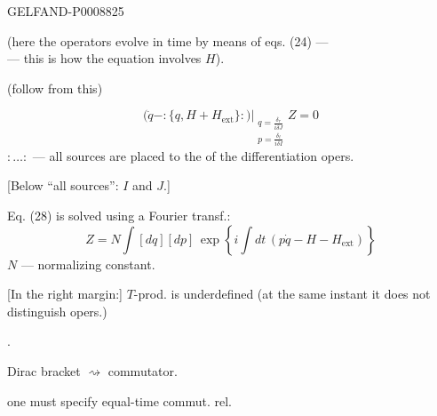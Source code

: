 \begin{GelfandAdjacentEvidence}{GELFAND-P000882}{5}


(here the operators evolve in time by means of eqs. (24) ---\\
--- this is how the equation involves $H$).

 (follow from this)

\end{GelfandAdjacentEvidence}

\begin{equation*}
\left.\bigl(\dot q-:\{q,H+H_{\mathrm{ext}}\}:\bigr)\right|_{\substack{
q=\frac{\delta_r}{i\delta J}\\
p=\frac{\delta_\ell}{i\delta I}}}Z=0
\tag{28}
\end{equation*}
$:\ldots:$ --- all sources are placed to the  of the differentiation opers.

[Below “all sources”: $I$ and $J$.]

Eq. (28) is solved using a Fourier transf.:
\begin{equation*}
Z=N\int[dq][dp]\,\exp\left\{i\int dt\,(p\dot q-H-H_{\mathrm{ext}})\right\}
\tag{29}
\end{equation*}
$N$ --- normalizing constant.

[In the right margin:] $T$-prod. is underdefined (at the same instant it does not distinguish opers.)

.

Dirac bracket $\rightsquigarrow$ commutator.

one must specify equal-time commut. rel.


